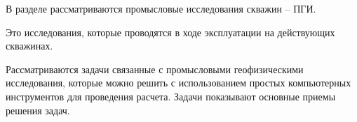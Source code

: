 В разделе рассматриваются промысловые исследования скважин -- ПГИ.

Это исследования, которые проводятся в ходе эксплуатации на действующих скважинах. 

Рассматриваются задачи связанные с промысловыми геофизическими исследования, которые можно решить с использованием простых компьютерных инструментов для проведения расчета.  Задачи показывают основные приемы решения задач.




















